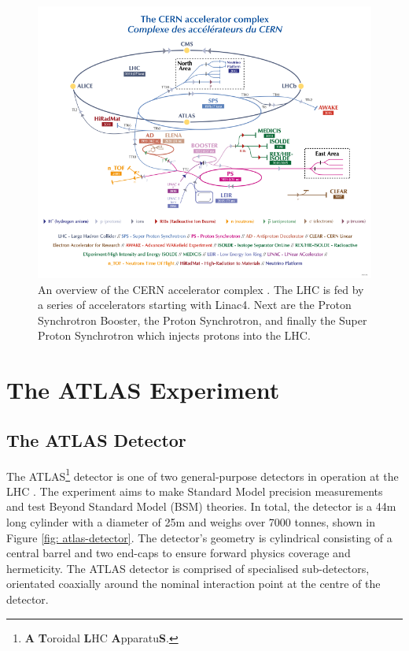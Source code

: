 \begin{figure}[htb!]
\includegraphics[width=\textwidth]{images/2-LHC-ATLAS/accelerator_complex.pdf}
\caption{An overview of the CERN accelerator complex \cite{CERN:2012:accelerators}. The LHC is fed by a series of accelerators starting with Linac4. Next are the Proton Synchrotron Booster, the Proton Synchrotron, and finally the Super Proton Synchrotron which injects protons into the LHC.}
\label{fig: accelerator-complex}
\end{figure}



\section{The ATLAS Experiment}
\label{atlas-section}

\subsection{The ATLAS Detector}
The ATLAS\footnote{\textbf{A} \textbf{T}oroidal \textbf{L}HC \textbf{A}pparatu\textbf{S}.} detector is one of two general-purpose detectors in operation at the LHC \cite{PERF-2007-01}. The experiment aims to make Standard Model precision measurements and test Beyond Standard Model (BSM) theories. In total, the detector is a 44m long cylinder with a diameter of 25m and weighs over 7000 tonnes, shown in Figure \ref{fig: atlas-detector}. The detector’s geometry is cylindrical consisting of a central barrel and two end-caps to ensure forward physics coverage and hermeticity. The ATLAS detector is comprised of specialised sub-detectors, orientated coaxially around the nominal interaction point at the centre of the detector. 

